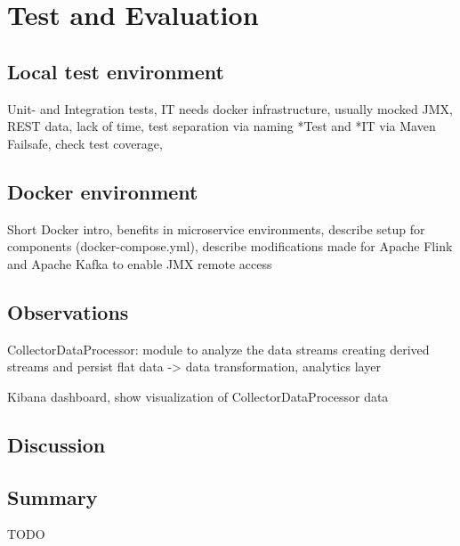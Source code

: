 \chapter{Test and Evaluation}
\section{Local test environment}

Unit- and Integration tests, IT needs docker infrastructure, usually mocked JMX, REST data,
lack of time, test separation via naming *Test and *IT via Maven Failsafe, check test coverage,

\section{Docker environment}

Short Docker intro, benefits in microservice environments, describe setup for components (docker-compose.yml),
describe modifications made for Apache Flink and Apache Kafka to enable JMX remote access

\section{Observations}

CollectorDataProcessor: module to analyze the data streams creating derived streams and persist flat
data -> data transformation, analytics layer

Kibana dashboard, show visualization of CollectorDataProcessor data

\section{Discussion}


\section{Summary}

TODO

